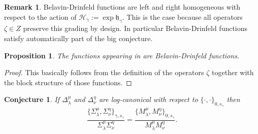 \documentclass[a4paper]{amsart}
\newtheorem{proposition}[theorem]{Proposition}
\newtheorem{conjecture}[theorem]{Conjecture}
\theoremstyle{definition}
\newtheorem{remark}[theorem]{Remark}
\newcommand{\mfh}{\mathfrak{h}}
\newcommand{\mcH}{\mathcal{H}}
\begin{document}
\begin{remark}
  Belavin-Drinfeld functions are left and right homogeneous with respect to the action of $\mcH_\gamma:=\exp\mfh_\gamma$.
  This is the case because all operators $\zeta\in Z$ preserve this grading by design.
  In particular Belavin-Drinfeld functions satisfy automatically part of the big conjecture.
\end{remark}

\begin{proposition}
  The functions appearing in \cite{GSV19} are Belavin-Drinfeld functions.
\end{proposition}
\begin{proof}
  This basically follows from the definition of the operators $\zeta$ together with the block structure of those functions.
\end{proof}

\begin{conjecture}
  If $\Delta_\lambda^\mu$ and $\Delta_\nu^\eta$ are log-canonical with respect to $\{\cdot,\cdot\}_{0,s_\gamma}$ then
  \[
    \frac{\{\Sigma_\lambda^\mu,\Sigma_\nu^\eta\}_{\gamma,s_\gamma}}{\Sigma_\lambda^\mu \Sigma_\nu^\eta} 
    = 
    \frac{\{M_\lambda^\mu,M_\nu^\eta\}_{0,s_\gamma}}{M_\lambda^\mu M_\nu^\eta}.
  \]
\end{conjecture}
\end{document}
